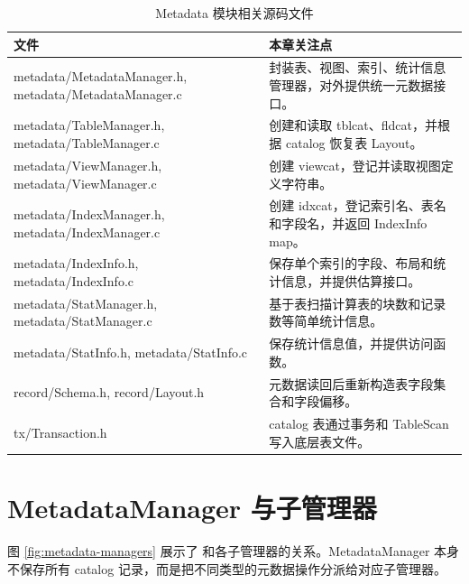 \begin{table}[htbp]
  \centering
  \caption{Metadata 模块相关源码文件}
  \label{tab:metadata-source-files}
  \begin{tabularx}{\textwidth}{>{\ttfamily}l Y}
    \toprule
    文件 & 本章关注点 \\
    \midrule
    metadata/MetadataManager.h, metadata/MetadataManager.c & 封装表、视图、索引、统计信息管理器，对外提供统一元数据接口。\\
    metadata/TableManager.h, metadata/TableManager.c & 创建和读取 tblcat、fldcat，并根据 catalog 恢复表 Layout。\\
    metadata/ViewManager.h, metadata/ViewManager.c & 创建 viewcat，登记并读取视图定义字符串。\\
    metadata/IndexManager.h, metadata/IndexManager.c & 创建 idxcat，登记索引名、表名和字段名，并返回 IndexInfo map。\\
    metadata/IndexInfo.h, metadata/IndexInfo.c & 保存单个索引的字段、布局和统计信息，并提供估算接口。\\
    metadata/StatManager.h, metadata/StatManager.c & 基于表扫描计算表的块数和记录数等简单统计信息。\\
    metadata/StatInfo.h, metadata/StatInfo.c & 保存统计信息值，并提供访问函数。\\
    record/Schema.h, record/Layout.h & 元数据读回后重新构造表字段集合和字段偏移。\\
    tx/Transaction.h & catalog 表通过事务和 TableScan 写入底层表文件。\\
    \bottomrule
  \end{tabularx}
\end{table}

\section{MetadataManager 与子管理器}
\label{sec:metadata-managers}

图 \ref{fig:metadata-managers} 展示了  和各子管理器的关系。MetadataManager 本身不保存所有 catalog 记录，而是把不同类型的元数据操作分派给对应子管理器。

